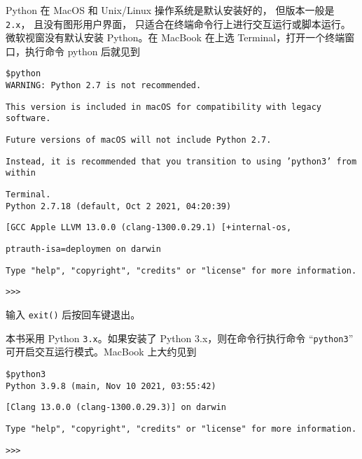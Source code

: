 \documentclass[main.tex]{subfiles}
\begin{document}
Python 在 MacOS 和 Unix/Linux 操作系统是默认安装好的，
但版本一般是 \texttt{2.x}，
且没有图形用户界面，
只适合在终端命令行上进行交互运行或脚本运行。
微软视窗没有默认安装 Python。在 MacBook 在上选 Terminal，打开一个终端窗口，执行命令 python 后就见到\\

\begin{spacing}{0.9}
\noindent\texttt{\$python}\\

\noindent\texttt{WARNING: Python 2.7 is not recommended. }

\noindent\texttt{This version is included in macOS for compatibility with legacy software. }

\noindent\texttt{Future versions of macOS will not include Python 2.7. }

\noindent\texttt{Instead, it is recommended that you transition to using 'python3' from within}

\noindent\texttt{Terminal.}\\

\noindent\texttt{Python 2.7.18 (default, Oct  2 2021, 04:20:39) }

\noindent\texttt{[GCC Apple LLVM 13.0.0 (clang-1300.0.29.1) [+internal-os, }

\noindent\texttt{ptrauth-isa=deploymen on darwin}

\noindent\texttt{Type "help", "copyright", "credits" or "license" for more information.}

\noindent\texttt{>>>} \\
\end{spacing}
\noindent 输入 \texttt{exit()} 后按回车键退出。

本书采用 Python \texttt{3.x}。如果安装了 Python 3.x，则在命令行执行命令 
 “\texttt{python3}”  可开启交互运行模式。MacBook 上大约见到\\
 
\begin{spacing}{0.9}
	\noindent\texttt{\$python3}\\
	
	\noindent\texttt{Python 3.9.8 (main, Nov 10 2021, 03:55:42)  }
	
	\noindent\texttt{[Clang 13.0.0 (clang-1300.0.29.3)] on darwin}

	\noindent\texttt{Type "help", "copyright", "credits" or "license" for more information.}
	
	\noindent\texttt{>>>} \\
\end{spacing} 
\end{document}
